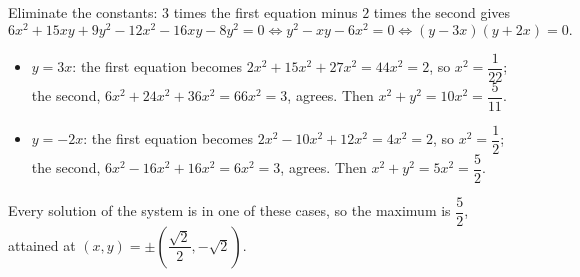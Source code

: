 Eliminate the constants: $3$ times the first equation minus $2$ times the second gives
\[
6x^2+15xy+9y^2-12x^2-16xy-8y^2=0\iff y^2-xy-6x^2=0\iff(y-3x)(y+2x)=0 .
\]
\begin{itemize}
\item $y=3x$: the first equation becomes $2x^2+15x^2+27x^2=44x^2=2$, so $x^2=\dfrac{1}{22}$; the second, $6x^2+24x^2+36x^2=66x^2=3$, agrees. Then $x^2+y^2=10x^2=\dfrac{5}{11}$.
\item $y=-2x$: the first equation becomes $2x^2-10x^2+12x^2=4x^2=2$, so $x^2=\dfrac{1}{2}$; the second, $6x^2-16x^2+16x^2=6x^2=3$, agrees. Then $x^2+y^2=5x^2=\dfrac{5}{2}$.
\end{itemize}
Every solution of the system is in one of these cases, so the maximum is $\boxed{\dfrac{5}{2}}$, attained at $(x,y)=\pm\left(\dfrac{\sqrt2}{2},-\sqrt2\right)$.
